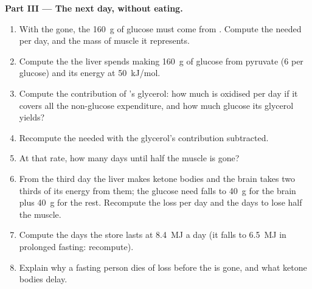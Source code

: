 \begin{problem}
\medskip
\noindent\textbf{Part III --- The next day, without eating.}
\begin{enumerate}[resume]
  \item With the  gone, the \qty{160}{g} of glucose must come
        from . Compute the  needed per day, and
        the mass of muscle it represents.
  \item Compute the  the liver spends making \qty{160}{g} of
        glucose from pyruvate (6  per glucose) and its energy at
        \qty{50}{kJ/mol}.
  \item Compute the contribution of 's glycerol: how much  is
        oxidised per day if it covers all the non-glucose expenditure,
        and how much glucose its glycerol yields?
  \item Recompute the  needed with the glycerol's contribution
        subtracted.
  \item At that rate, how many days until half the muscle is gone?
  \item From the third day the liver makes ketone bodies and the brain
        takes two thirds of its energy from them; the glucose need
        falls to \qty{40}{g} for the brain plus \qty{40}{g} for the
        rest. Recompute the  loss per day and the days to lose
        half the muscle.
  \item Compute the days the  store lasts at \qty{8.4}{MJ} a day
        (it falls to \qty{6.5}{MJ} in prolonged fasting: recompute).
  \item Explain why a fasting person dies of  loss before the
         is gone, and what ketone bodies delay.
\end{enumerate}


\end{problem}
